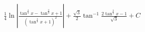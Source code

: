 \documentclass[preview]{standalone}
\begin{document}
\begin{align*}
\frac{1}{4}\ln|\frac{\tan^{\frac{4}{3}}x-\tan^{\frac{2}{3}}x+1}{(\tan^{\frac{2}{3}}x+1)^2}|+\frac{\sqrt3}{2}\tan^{-1}\frac{2\tan^{\frac{2}{3}}x-1}{\sqrt3}+C
\end{align*}
\end{document}
